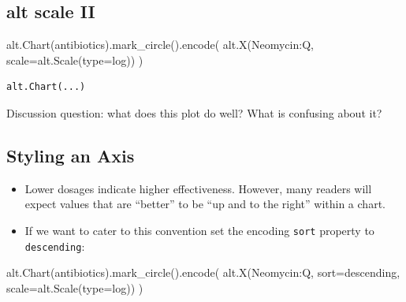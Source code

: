 \documentclass[
  letterpaper,
  DIV=11,
  numbers=noendperiod]{scrartcl}
\newenvironment{Shaded}{\begin{snugshade}}{\end{snugshade}}
\newcommand{\BuiltInTok}[1]{\textcolor[rgb]{0.00,0.23,0.31}{#1}}
\newcommand{\NormalTok}[1]{\textcolor[rgb]{0.00,0.23,0.31}{#1}}
\newcommand{\OperatorTok}[1]{\textcolor[rgb]{0.37,0.37,0.37}{#1}}
\newcommand{\StringTok}[1]{\textcolor[rgb]{0.13,0.47,0.30}{#1}}
\providecommand{\tightlist}{%
  \setlength{\itemsep}{0pt}\setlength{\parskip}{0pt}}\usepackage{longtable,booktabs,array}
\begin{document}
\subsection{alt scale II}\label{alt-scale-ii}

\begin{Shaded}
\begin{Highlighting}[]
\NormalTok{alt.Chart(antibiotics).mark\_circle().encode(}
\NormalTok{    alt.X(}\StringTok{\textquotesingle{}Neomycin:Q\textquotesingle{}}\NormalTok{,}
\NormalTok{          scale}\OperatorTok{=}\NormalTok{alt.Scale(}\BuiltInTok{type}\OperatorTok{=}\StringTok{\textquotesingle{}log\textquotesingle{}}\NormalTok{))}
\NormalTok{)}
\end{Highlighting}
\end{Shaded}

\begin{verbatim}
alt.Chart(...)
\end{verbatim}

Discussion question: what does this plot do well? What is confusing
about it?

\subsection{Styling an Axis}\label{styling-an-axis}

\begin{itemize}
\tightlist
\item
  Lower dosages indicate higher effectiveness. However, many readers
  will expect values that are ``better'' to be ``up and to the right''
  within a chart.
\item
  If we want to cater to this convention set the encoding \texttt{sort}
  property to \texttt{\textquotesingle{}descending\textquotesingle{}}:
\end{itemize}

\begin{Shaded}
\begin{Highlighting}[]
\NormalTok{alt.Chart(antibiotics).mark\_circle().encode(}
\NormalTok{    alt.X(}\StringTok{\textquotesingle{}Neomycin:Q\textquotesingle{}}\NormalTok{,}
\NormalTok{          sort}\OperatorTok{=}\StringTok{\textquotesingle{}descending\textquotesingle{}}\NormalTok{,}
\NormalTok{          scale}\OperatorTok{=}\NormalTok{alt.Scale(}\BuiltInTok{type}\OperatorTok{=}\StringTok{\textquotesingle{}log\textquotesingle{}}\NormalTok{))}
\NormalTok{)}
\end{Highlighting}
\end{Shaded}
\end{document}
